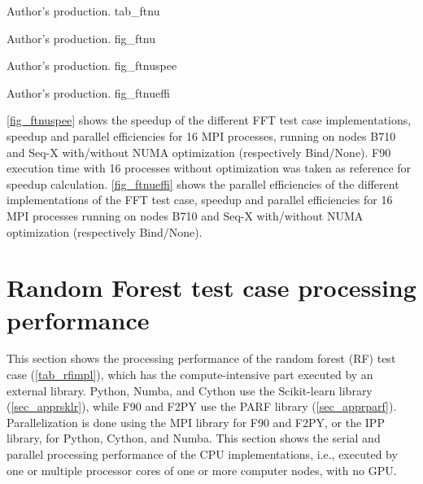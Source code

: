      {Author's production.} {tab_ftnu}

     {Author's production.} {fig_ftnu}

     {Author's production.} {fig_ftnuspee}

     {Author's production.} {fig_ftnueffi}

\autoref {fig_ftnuspee} shows the speedup of the different FFT test case implementations, speedup and parallel efficiencies for 16 MPI processes, running on nodes B710 and Seq-X with/without NUMA optimization (respectively Bind/None). F90 execution time with 16 processes without optimization was taken as reference for speedup calculation. \autoref {fig_ftnueffi} shows the parallel efficiencies of the different implementations of the FFT test case, speedup and parallel efficiencies for 16 MPI processes running on nodes B710 and Seq-X with/without NUMA optimization (respectively Bind/None).

%
%
%
%
%
%
%
\section{Random Forest test case processing performance}
\label{sec_analrf}

This section shows the processing performance of the random forest (RF) test case (\autoref {tab_rfimpl}), which has the compute-intensive part executed by an external library. Python, Numba, and Cython use the Scikit-learn library (\autoref {sec_apprsklr}), while F90 and F2PY use the PARF library (\autoref {sec_apprparf}). Parallelization is done using the MPI library for F90 and F2PY, or the IPP library, for Python, Cython, and Numba. This section shows the serial and parallel processing performance of the CPU implementations, i.e., executed by one or multiple processor cores of one or more computer nodes, with no GPU. 

